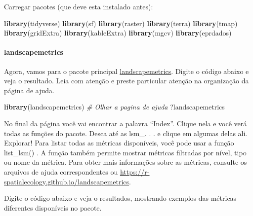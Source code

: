 \documentclass[
]{article}
\newenvironment{Shaded}{\begin{snugshade}}{\end{snugshade}}
\newcommand{\CommentTok}[1]{\textcolor[rgb]{0.56,0.35,0.01}{\textit{#1}}}
\newcommand{\FunctionTok}[1]{\textcolor[rgb]{0.13,0.29,0.53}{\textbf{#1}}}
\newcommand{\NormalTok}[1]{#1}
\begin{document}
Carregar pacotes (que deve esta instalado antes):

\begin{Shaded}
\begin{Highlighting}[]
\FunctionTok{library}\NormalTok{(tidyverse)}
\FunctionTok{library}\NormalTok{(sf)}
\FunctionTok{library}\NormalTok{(raster)}
\FunctionTok{library}\NormalTok{(terra)}
\FunctionTok{library}\NormalTok{(tmap)}
\FunctionTok{library}\NormalTok{(gridExtra)}
\FunctionTok{library}\NormalTok{(kableExtra)}
\FunctionTok{library}\NormalTok{(mgcv)}
\FunctionTok{library}\NormalTok{(eprdados)}
\end{Highlighting}
\end{Shaded}

\hypertarget{landscapemetrics}{%
\paragraph{landscapemetrics}\label{landscapemetrics}}

Agora, vamos para o pacote principal \href{https://r-spatialecology.github.io/landscapemetrics/}{landscapemetrics}. Digite o código abaixo e veja o resultado. Leia com atenção e preste particular atenção na organização da página de ajuda.

\begin{Shaded}
\begin{Highlighting}[]
\FunctionTok{library}\NormalTok{(landscapemetrics)}
\CommentTok{\# Olhar a pagina de ajuda}
\NormalTok{?landscapemetrics}
\end{Highlighting}
\end{Shaded}

No final da página você vai encontrar a palavra ``Index''. Clique nela e você verá todas as funções do pacote. Desca até as lsm\_. . . e clique em algumas delas ali. Explorar!
Para listar todas as métricas disponíveis, você pode usar a função \colorbox[HTML]{dedede}{list\_lsm()} . A função também permite mostrar métricas filtradas por nível, tipo ou nome da métrica. Para obter mais informações sobre as métricas, consulte os arquivos de ajuda correspondentes ou \url{https://r-spatialecology.github.io/landscapemetrics}.

Digite o código abaixo e veja o resultados, mostrando exemplos das métricas diferentes disponíveis no pacote.
\end{document}
